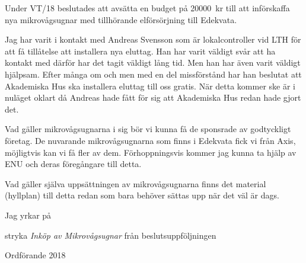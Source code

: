 \documentclass[../_main/handlingar.tex]{subfiles}
\begin{document}
\beslutsuppfoljning{}
Under VT/18 beslutades att avsätta en budget på \SI{20 000}{kr} till att införskaffa nya mikrovågsugnar med tillhörande elförsörjning till Edekvata.

Jag har varit i kontakt med Andreas Svensson som är lokalcontroller vid LTH för att få tillåtelse att installera nya eluttag. Han har varit väldigt svår att ha kontakt med därför har det tagit väldigt lång tid. Men han har även varit väldigt hjälpsam. Efter många om och men med en del missförstånd har han beslutat att Akademiska Hus ska installera eluttag till oss gratis. När detta kommer ske är i nuläget oklart då Andreas hade fått för sig att Akademiska Hus redan hade gjort det.

Vad gäller mikrovågsugnarna i sig bör vi kunna få de sponsrade av godtyckligt företag. De nuvarande mikrovågsugnarna som finns i Edekvata fick vi från Axis, möjligtvis kan vi få fler av dem. Förhoppningsvis kommer jag kunna ta hjälp av ENU och deras föregångare till detta.

Vad gäller själva uppsättningen av mikrovågsugnarna finns det material (hyllplan) till detta redan som bara behöver sättas upp när det väl är dags.

Jag yrkar på

\begin{attsatser}
    \att stryka \textit{Inköp av Mikrovågsugnar} från beslutsuppföljningen
\end{attsatser}

\begin{signatures}{1}
    \mvh
    \signature{Daniel Bakic}{Ordförande 2018}
\end{signatures}
\end{document}
